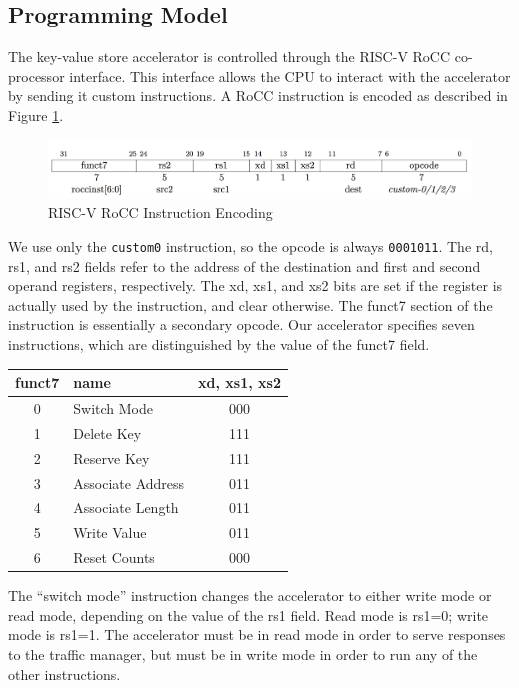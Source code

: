 \subsection{Programming Model}

The key-value store accelerator is controlled through the RISC-V RoCC
co-processor interface. This interface allows the CPU to interact with the
accelerator by sending it custom instructions. A RoCC instruction is encoded
as described in Figure \ref{fig:roccencoding}.

\begin{figure}[h]
    \begin{center}
\includegraphics[width=0.9\linewidth]{../../img/rocc-encoding.png}
\caption{RISC-V RoCC Instruction Encoding}
\label{fig:roccencoding}
\end{center}
\end{figure}


We use only the \texttt{custom0} instruction, so the opcode is always
\texttt{0001011}.
The rd, rs1, and rs2 fields refer to the address of the destination and
first and second operand registers, respectively. The xd, xs1, and xs2 bits
are set if the register is actually used by the instruction, and clear
otherwise. The funct7 section of the instruction is essentially a secondary
opcode. Our accelerator specifies seven instructions, which are distinguished
by the value of the funct7 field.

\begin{center}
\begin{tabular}{|c|l|c|}
    \hline
    funct7 & name & xd, xs1, xs2 \\
    \hline
    0 & Switch Mode & 000 \\
    1 & Delete Key & 111 \\
    2 & Reserve Key & 111 \\
    3 & Associate Address & 011 \\
    4 & Associate Length & 011 \\
    5 & Write Value & 011 \\
    6 & Reset Counts & 000 \\
    \hline
\end{tabular}
\end{center}

The ``switch mode'' instruction changes the accelerator to either write mode or
read mode, depending on the value of the rs1 field. Read mode is rs1=0;
write mode is rs1=1. The accelerator must be in read mode in order to serve
responses to the traffic manager, but must be in write mode in order to run
any of the other instructions.

